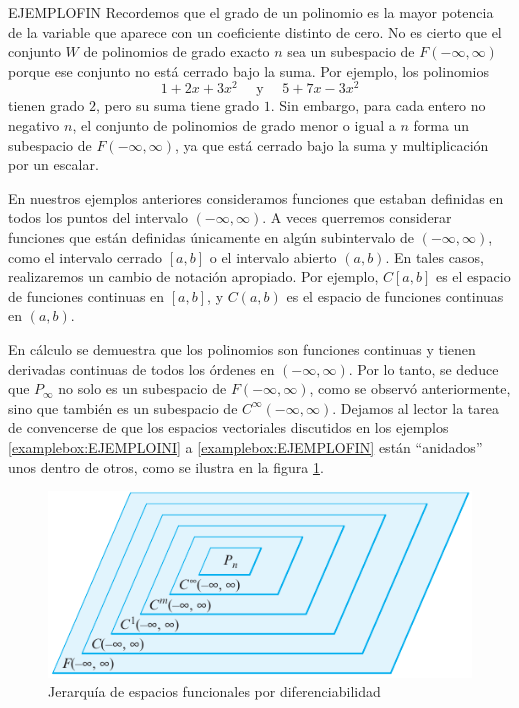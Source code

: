 \begin{examplebox}{}{EJEMPLOFIN}
    Recordemos que el grado de un polinomio es la mayor potencia de la variable que aparece con un coeficiente distinto de cero. No es cierto que el conjunto $W$ de polinomios de grado exacto $n$ sea un subespacio de $F(-\infty, \infty)$ porque ese conjunto no está cerrado bajo la suma. Por ejemplo, los polinomios
    $$1 + 2x + 3x^2 \quad \text{ y } \quad 5 + 7x - 3x^2$$
    tienen grado $2$, pero su suma tiene grado $1$. Sin embargo, para cada entero no negativo $n$, el conjunto de polinomios de grado menor o igual a $n$ forma un subespacio de $F(-\infty, \infty)$, ya que está cerrado bajo la suma y multiplicación por un escalar.
\end{examplebox}

En nuestros ejemplos anteriores consideramos funciones que estaban definidas en todos los puntos del intervalo $(-\infty, \infty)$. A veces querremos considerar funciones que están definidas únicamente en algún subintervalo de $(-\infty, \infty)$, como el intervalo cerrado $[a, b]$ o el intervalo abierto $(a, b)$. En tales casos, realizaremos un cambio de notación apropiado. Por ejemplo, $C[a, b]$ es el espacio de funciones continuas en $[a, b]$, y $C(a, b)$ es el espacio de funciones continuas en $(a, b)$.

En cálculo se demuestra que los polinomios son funciones continuas y tienen derivadas continuas de todos los órdenes en $(-\infty, \infty)$. Por lo tanto, se deduce que $P_\infty$ no solo es un subespacio de $F(-\infty, \infty)$, como se observó anteriormente, sino que también es un subespacio de $C^\infty(-\infty, \infty)$. Dejamos al lector la tarea de convencerse de que los espacios vectoriales discutidos en los ejemplos \ref{examplebox:EJEMPLOINI} a \ref{examplebox:EJEMPLOFIN} están “anidados” unos dentro de otros, como se ilustra en la figura \ref{JAJAIQPAPOAOSOOAKJS}.
\begin{figure}[h!]
    \centering
    \includegraphics[width=\textwidth]{Images/Capitulo1/Anidados.pdf}
    \caption{Jerarquía de espacios funcionales por diferenciabilidad}
    \label{JAJAIQPAPOAOSOOAKJS}
\end{figure}

